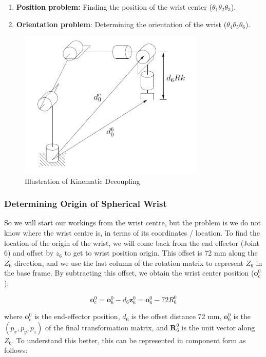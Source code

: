 \begin{enumerate}
  \item  \textbf{Position problem:} Finding the position of the wrist center (\(\theta_1\)\(\theta_2\)\(\theta_3\)).
  \item  \textbf{Orientation problem}: Determining the orientation of the wrist (\(\theta_4\)\(\theta_5\)\(\theta_6\)).
\end{enumerate}


\begin  {figure}[H]
\centering
\includegraphics[width=3.5in]{pics/inverse_hutchinson.png}
\caption {Illustration of Kinematic Decoupling \cite{Modeling}}
\label{fig:kinematic_decoupling}
\end{figure}

\subsubsection{Determining Origin of Spherical Wrist}
So we will start our workings from the wrist centre, but the problem is we do not know where the wrist centre is, in terms of its coordinates / location. To find the location of the origin of the wrist, we will come back from the end effector (Joint 6) and offset by \(z_6\) to get to wrist position origin.
\noindent This offset is 72 mm along the \(Z_6\) direction, and we use the last column of the rotation matrix to represent \(Z_6\) in the base frame. By subtracting this offset, we obtain the wrist center position (\(\mathbf{o}_c^0\)):

\[
  \mathbf{o}_c^0 = \mathbf{o}_6^0 - d_6 \mathbf{z}_6^0 = \mathbf{o}_6^0 -72{R}_6^0
\]

\noindent where \(\mathbf{o}_c^0\) is the end-effector position, \(d_6\) is the offset distance 72 mm, \(\mathbf{o}_6^0\) is the \((p_x, p_y, p_z)\) of the final transformation matrix, and \(\mathbf{R}_6^0\) is the unit vector along \(Z_6\). To understand this better, this can be represented in component form as follows:

